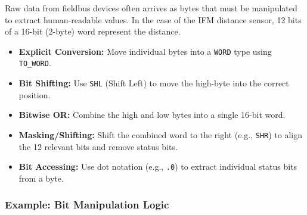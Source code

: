 \documentclass[11pt,a4paper]{article}
\begin{document}
Raw data from fieldbus devices often arrives as bytes that must be manipulated to extract human-readable values. In the case of the IFM distance sensor, 12 bits of a 16-bit (2-byte) word represent the distance.

\begin{itemize}[leftmargin=*]
    \item \textbf{Explicit Conversion:} Move individual bytes into a \texttt{WORD} type using \texttt{TO\_WORD}.
    \item \textbf{Bit Shifting:} Use \texttt{SHL} (Shift Left) to move the high-byte into the correct position.
    \item \textbf{Bitwise OR:} Combine the high and low bytes into a single 16-bit word.
    \item \textbf{Masking/Shifting:} Shift the combined word to the right (e.g., \texttt{SHR}) to align the 12 relevant bits and remove status bits.
    \item \textbf{Bit Accessing:} Use dot notation (e.g., \texttt{.0}) to extract individual status bits from a byte.
\end{itemize}

\subsubsection*{Example: Bit Manipulation Logic}
\end{document}

